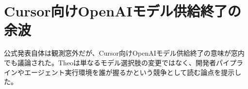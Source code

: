 \section{Cursor向けOpenAIモデル供給終了の余波}
公式発表自体は観測窓外だが、Cursor向けOpenAIモデル供給終了の意味が窓内でも議論された。Theoは単なるモデル選択肢の変更ではなく、開発者パイプラインやエージェント実行環境を誰が握るかという競争として読む論点を提示した。
